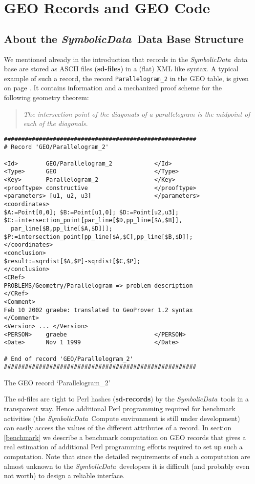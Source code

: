 \documentclass[11pt]{article}
\newcommand{\SD}{{\it Symbo\-lic\-Data}}
\begin{document}
\section{GEO Records and GEO Code}

\subsection{About the \SD\ Data Base Structure}

We mentioned already in the introduction that records in the \SD\ data
base are stored as ASCII files ({\bf sd-files}) in a (flat) XML like
syntax. A typical example of such a record, the record
\verb|Parallelogram_2| in the GEO table, is given on page
\pageref{table:1}.  It contains information and a mechanized proof
scheme for the following geometry theorem:
\begin{quote}\it
The intersection point of the diagonals of a parallelogram is the
midpoint of each of the diagonals.
\end{quote}

\begin{table}[t]\label{table:1}{\small
\begin{verbatim}
#######################################################
# Record 'GEO/Parallelogram_2'

<Id>        GEO/Parallelogram_2            </Id>
<Type>      GEO                            </Type>
<Key>       Parallelogram_2                </Key>
<prooftype> constructive                   </prooftype>
<parameters> [u1, u2, u3]                  </parameters>
<coordinates> 
$A:=Point[0,0]; $B:=Point[u1,0]; $D:=Point[u2,u3];
$C:=intersection_point[par_line[$D,pp_line[$A,$B]],
  par_line[$B,pp_line[$A,$D]]];
$P:=intersection_point[pp_line[$A,$C],pp_line[$B,$D]];
</coordinates>
<conclusion> 
$result:=sqrdist[$A,$P]-sqrdist[$C,$P]; 
</conclusion>
<CRef>      
PROBLEMS/Geometry/Parallelogram => problem description 
</CRef>
<Comment>   
Feb 10 2002 graebe: translated to GeoProver 1.2 syntax 
</Comment>
<Version> ... </Version>
<PERSON>    graebe                         </PERSON>
<Date>      Nov 1 1999                     </Date>
  
# End of record 'GEO/Parallelogram_2'
#######################################################
\end{verbatim}}
\centerline{The GEO record `Parallelogram\_2'}
\end{table}

The sd-files are tight to Perl hashes ({\bf sd-records}) by the \SD\
tools in a transparent way. Hence additional Perl programming required
for benchmark activities (the \SD\ Compute environment is still under
development) can easily access the values of the different attributes
of a record. In section \ref{benchmark} we describe a benchmark
computation on GEO records that gives a real estimation of additional
Perl programming efforts required to set up such a computation.  Note
that since the detailed requirements of such a computation are almost
unknown to the \SD\ developers it is difficult (and probably even not
worth) to design a reliable interface.
\medskip
\end{document}
